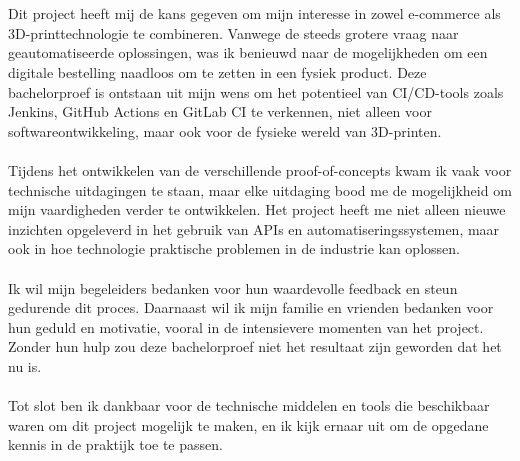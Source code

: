
\chapter*{}%
\label{ch:voorwoord}


Dit project heeft mij de kans gegeven om mijn interesse in zowel e-commerce als 3D-printtechnologie te combineren. Vanwege de steeds grotere vraag naar geautomatiseerde oplossingen, was ik benieuwd naar de mogelijkheden om een digitale bestelling naadloos om te zetten in een fysiek product. Deze bachelorproef is ontstaan uit mijn wens om het potentieel van CI/CD-tools zoals Jenkins, GitHub Actions en GitLab CI te verkennen, niet alleen voor softwareontwikkeling, maar ook voor de fysieke wereld van 3D-printen.
\\\\
Tijdens het ontwikkelen van de verschillende proof-of-concepts kwam ik vaak voor technische uitdagingen te staan, maar elke uitdaging bood me de mogelijkheid om mijn vaardigheden verder te ontwikkelen. Het project heeft me niet alleen nieuwe inzichten opgeleverd in het gebruik van APIs en automatiseringssystemen, maar ook in hoe technologie praktische problemen in de industrie kan oplossen.
\\\\
Ik wil mijn begeleiders bedanken voor hun waardevolle feedback en steun gedurende dit proces. Daarnaast wil ik mijn familie en vrienden bedanken voor hun geduld en motivatie, vooral in de intensievere momenten van het project. Zonder hun hulp zou deze bachelorproef niet het resultaat zijn geworden dat het nu is.
\\\\
Tot slot ben ik dankbaar voor de technische middelen en tools die beschikbaar waren om dit project mogelijk te maken, en ik kijk ernaar uit om de opgedane kennis in de praktijk toe te passen.

